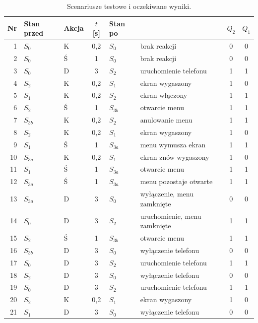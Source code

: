 \begin{table}[H]
\centering
\caption{Scenariusze testowe i oczekiwane wyniki.}
\label{tab:testy}
\begin{tabular}{rllcll|cc}
\toprule
Nr & Stan przed & Akcja & $t$ [s] & Stan po & & $Q_2$ & $Q_1$ \\
\midrule
 1 & $S_0$    & K & 0,2 & $S_0$    & brak reakcji           & 0 & 0 \\
 2 & $S_0$    & Ś & 1   & $S_0$    & brak reakcji           & 0 & 0 \\
 3 & $S_0$    & D & 3   & $S_2$    & uruchomienie telefonu  & 1 & 1 \\
 4 & $S_2$    & K & 0,2 & $S_1$    & ekran wygaszony        & 1 & 0 \\
 5 & $S_1$    & K & 0,2 & $S_2$    & ekran włączony         & 1 & 1 \\
 6 & $S_2$    & Ś & 1   & $S_{3b}$ & otwarcie menu          & 1 & 1 \\
 7 & $S_{3b}$ & K & 0,2 & $S_2$    & anulowanie menu        & 1 & 1 \\
 8 & $S_2$    & K & 0,2 & $S_1$    & ekran wygaszony        & 1 & 0 \\
 9 & $S_1$    & Ś & 1   & $S_{3a}$ & menu wymusza ekran     & 1 & 1 \\
10 & $S_{3a}$ & K & 0,2 & $S_1$    & ekran znów wygaszony   & 1 & 0 \\
11 & $S_1$    & Ś & 1   & $S_{3a}$ & otwarcie menu          & 1 & 1 \\
12 & $S_{3a}$ & Ś & 1   & $S_{3a}$ & menu pozostaje otwarte & 1 & 1 \\
13 & $S_{3a}$ & D & 3   & $S_0$    & wyłączenie, menu zamknięte & 0 & 0 \\
14 & $S_0$    & D & 3   & $S_2$    & uruchomienie, menu zamknięte & 1 & 1 \\
15 & $S_2$    & Ś & 1   & $S_{3b}$ & otwarcie menu          & 1 & 1 \\
16 & $S_{3b}$ & D & 3   & $S_0$    & wyłączenie telefonu    & 0 & 0 \\
17 & $S_0$    & D & 3   & $S_2$    & uruchomienie telefonu  & 1 & 1 \\
18 & $S_2$    & D & 3   & $S_0$    & wyłączenie telefonu    & 0 & 0 \\
19 & $S_0$    & D & 3   & $S_2$    & uruchomienie telefonu  & 1 & 1 \\
20 & $S_2$    & K & 0,2 & $S_1$    & ekran wygaszony        & 1 & 0 \\
21 & $S_1$    & D & 3   & $S_0$    & wyłączenie telefonu    & 0 & 0 \\
\bottomrule
\end{tabular}
\end{table}

